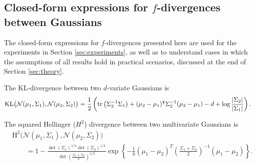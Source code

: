 \subsection{Closed-form expressions for $f$-divergences between Gaussians}\label{subsec:f-div-closed-form-gaussians}

The closed-form expressions for $f$-divergences presented here 
are used for the experiments in Section \ref{sec:experiments}, as well as to understand cases in which the assumptions of all results hold in practical scenarios, discussed at the end of Section \ref{sec:theory}.



\medskip
 
\begin{lemma}
The KL-divergence between two $d$-variate Gaussians is
\begin{align*}
\mathrm{KL}\bigl( \mathcal{N}(\mu_1, \Sigma_1), 
\mathcal{N}(\mu_2, \Sigma_2)\bigr) = \frac{1}{2} \left( \text{tr}\left(\Sigma_2^{-1} \Sigma_1\right)
+ (\mu_2  - \mu_1)^\intercal \Sigma_2^{-1}(\mu_2 - \mu_1) - d + \log\frac{|\Sigma_2|}{|\Sigma_1|}
\right).
\end{align*}
\end{lemma}

\medskip

\begin{lemma}
The squared Hellinger ($H^2$) divergence between two multivariate Gaussians is
\begin{align*}
&\mathrm{H}^2\bigl( \mathcal{N}(\mu_1, \Sigma_1), 
\mathcal{N}(\mu_2, \Sigma_2)\bigr) \\
&\qquad = 1 - \frac{ \det (\Sigma_1)^{1/4} \det (\Sigma_2) ^{1/4}} { \det \left( \frac{\Sigma_1 + \Sigma_2}{2}\right)^{1/2} }
              \exp\left\{-\frac{1}{8}(\mu_1 - \mu_2)^T 
              \left(\frac{\Sigma_1 + \Sigma_2}{2}\right)^{-1}
              (\mu_1 - \mu_2)              
              \right\}.
\end{align*}
\end{lemma}


\medskip

